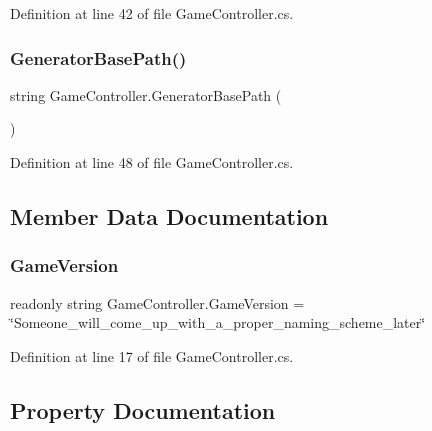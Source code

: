 Definition at line 42 of file Game\+Controller.\+cs.

\mbox{\label{class_game_controller_a69e1467ff4c36d433484356f15949c56}} 
\subsubsection{\texorpdfstring{Generator\+Base\+Path()}{GeneratorBasePath()}}
{\footnotesize\ttfamily string Game\+Controller.\+Generator\+Base\+Path (\begin{DoxyParamCaption}{ }\end{DoxyParamCaption})}



Definition at line 48 of file Game\+Controller.\+cs.



\subsection{Member Data Documentation}
\mbox{\label{class_game_controller_a16770a91abcdf92f012418daf53c138d}} 
\subsubsection{\texorpdfstring{Game\+Version}{GameVersion}}
{\footnotesize\ttfamily readonly string Game\+Controller.\+Game\+Version = \char`\"{}Someone\+\_\+will\+\_\+come\+\_\+up\+\_\+with\+\_\+a\+\_\+proper\+\_\+naming\+\_\+scheme\+\_\+later\char`\"{}\hspace{0.3cm}{\ttfamily [static]}}



Definition at line 17 of file Game\+Controller.\+cs.



\subsection{Property Documentation}
\mbox{\label{class_game_controller_abe6246464a3deffea7bac0356478ba89}} 
